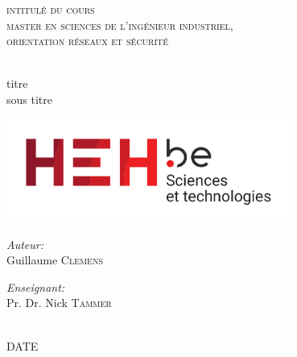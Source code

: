 \begin{titlepage}
  \begin{center}

    \textsc{\LARGE intitulé du cours}\\[0.5cm]
    \textsc{\large master en sciences de l'ingénieur industriel,}\\
    \textsc{\large orientation réseaux et sécurité}\\[0.5cm]

    \begin{vc}
		\begingroup
		\HRule\\
		\huge titre \\[1cm]
		\large sous titre
		\HRule\\
		\endgroup
	\end{vc}
	
	\includegraphics[width=0.7\textwidth]{img/logo/heh-technical}\\[2cm]
	
	\begin{minipage}{0.4\textwidth}
      \begin{flushleft} \large
        \emph{Auteur:}\\
        Guillaume \textsc{Clemens}
      \end{flushleft}
    \end{minipage}
    \begin{minipage}{0.4\textwidth}
      \begin{flushright} \large
        \emph{Enseignant:}\\
        Pr. Dr. Nick \textsc{Tammer}
      \end{flushright}
    \end{minipage}\\[3cm]
    
    \large DATE
    \vfill
  \end{center}
\end{titlepage}

